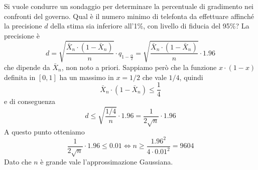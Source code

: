 \begin{example}
	Si vuole condurre un sondaggio per determinare la percentuale di gradimento nei confronti del
	governo. Qual è il numero minimo di telefonta da effettuare affinché la precisione $d$ della
	stima sia inferiore all'1\%, con livello di fiducia del 95\%? La precisione è
	\[
		d = \sqrt{\frac{\bar{X}_n \cdot (1 - \bar{X}_n)}{n}} \cdot
		q_{1 - \frac{\alpha}{2}} = \sqrt{\frac{\bar{X}_n \cdot (1 - \bar{X}_n)}{n}} \cdot
		1.96
	\]
	che dipende da $\bar{X}_n$, non noto a priori. Sappiamo però che la funzione
	$x \cdot (1-x)$ definita in $[0,1]$ ha un massimo in $x=1/2$ che vale $1/4$, quindi
	\[ \bar{X}_n \cdot (1 - \bar{X}_n) \leq \frac{1}{4} \]
	e di conseguenza
	\[
		d \leq \sqrt{\frac{1/4}{n}} \cdot 1.96 = \frac{1}{2 \sqrt{n}} \cdot 1.96
	\]
	A questo punto otteniamo
	\[
		\frac{1}{2 \sqrt{n}} \cdot 1.96 \leq 0.01 \iff
		n \geq \frac{1.96^2}{4 \cdot 0.01^2} = 9604
	\]
	Dato che $n$ è grande vale l'approssimazione Gaussiana.
\end{example}